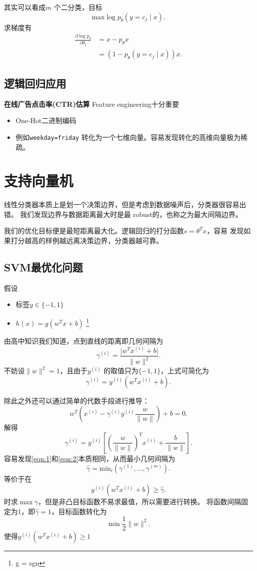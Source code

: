其实可以看成$m$ 个二分类，目标
\[
		\mathrm{max} \log p_{\theta}\left( y=c_{j} \mid x \right) 
.\] 
求梯度有
\begin{align*}
		\frac{\partial \log p_{\theta}}{\partial \theta_{j}} 
		&= x - p_{\theta}x  \\
		&= \left( 1-p_{\theta}\left( y=c_j \mid x \right)  \right) x 
.\end{align*} 
\subsection{逻辑回归应用}
\noindent \textbf{在线广告点击率(CTR)估算}
Feature engineering十分重要
\begin{itemize}
		\item One-Hot二进制编码 
        \item 例如\verb|weekday=friday| 转化为一个七维向量。容易发现转化的高维向量极为稀疏。		
\end{itemize}

\section{支持向量机} 
线性分类器本质上是划一个决策边界，但是考虑到数据噪声后，分类器很容易出错。
我们发现边界与数据距离最大时是最
robust的，也称之为最大间隔边界。

我们的优化目标便是最短距离最大化。逻辑回归的打分函数$s=\theta^{T} x$，容易
发现如果打分越高的样例越远离决策边界，分类器越可靠。

\subsection{SVM最优化问题}
假设
\begin{itemize}
		\item 标签$y \in \{-1,1\} $ 
		\item $h\left( x \right) = g\left( w^{T}x + b \right) $ \footnote{g = sgn}
\end{itemize}
由高中知识我们知道，点到直线的距离即几何间隔为
\[
		\gamma^{(i)} = \frac{ \lvert w^{T}x^{(i)} + b   \rvert }{\|w\|^2}
.\]
不妨设$\|w\|^2 = 1$，且由于$y^{(i)}$ 的取值只为$\{-1,1\} $，上式可简化为
\begin{equation}	
		\gamma^{(i)} = y^{(i)} \left( w^{T}x^{(i)} + b \right) \label{eqn:1}
.\end{equation}
 
除此之外还可以通过简单的代数手段进行推导：
\[
		w^{T} \left( x^{(i)} - \gamma^{(i)} y^{(i)} \frac{w}{\|w\|} \right)  + b= 0
.\] 
解得
\begin{equation}
		\gamma^{(i)} = y^{(i)} \left[ \left( \frac{w}{\|w\|} \right) ^{T} x^{(i)} + \frac{b}{\|w\|} \right] \label{eqn:2}
.\end{equation}
容易发现\eqref{eqn:1}和\eqref{eqn:2}本质相同，从而最小几何间隔为
\[
		\hat{ \gamma} = \mathrm{min}_{i} \left( \gamma^{(1)},\ldots, \gamma^{(m)} \right) 
.\] 
等价于在
\[
		y^{(i)} \left( w^{T}x^{(i)}  + b \right) \ge  \hat{\gamma}
.\] 
时求$\max \gamma$，但是非凸目标函数不易求最值，所以需要进行转换。
将函数间隔固定为1，即$\hat{\gamma} = 1$，目标函数转化为
\[
\min \frac{1}{2} \|w \|^2
.\] 
使得$y^{(i)} \left( w^{T}x^{(i)} + b \right)  \ge  1$

